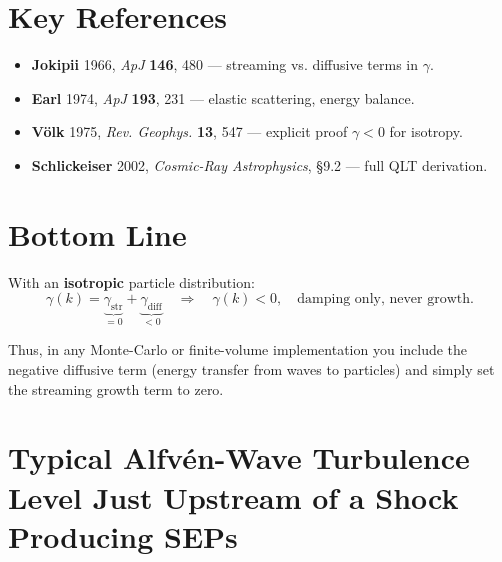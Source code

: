 \section*{Key References}

\begin{itemize}
\item \textbf{Jokipii} 1966, \textit{ApJ} \textbf{146}, 480 — streaming vs. diffusive terms in $\gamma$.
\item \textbf{Earl} 1974, \textit{ApJ} \textbf{193}, 231 — elastic scattering, energy balance.
\item \textbf{Völk} 1975, \textit{Rev. Geophys.} \textbf{13}, 547 — explicit proof $\gamma < 0$ for isotropy.
\item \textbf{Schlickeiser} 2002, \textit{Cosmic-Ray Astrophysics}, §9.2 — full QLT derivation.
\end{itemize}

\section*{Bottom Line}

With an \textbf{isotropic} particle distribution:
\[
\boxed{
\gamma(k) = \underbrace{\gamma_{\text{str}}}_{=0} + \underbrace{\gamma_{\text{diff}}}_{<0}
\quad \Longrightarrow \quad \gamma(k) < 0, \quad \text{damping only, never growth}.
}
\]

\noindent
Thus, in any Monte-Carlo or finite-volume implementation you include the negative diffusive term (energy transfer from waves to particles) and simply set the streaming growth term to zero.


\section*{Typical Alfvén-Wave Turbulence Level Just Upstream of a Shock Producing SEPs}

